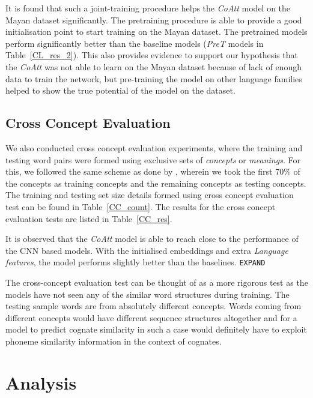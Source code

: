 \documentclass[11pt,letterpaper]{article}
\begin{document}
It is found that such a joint-training procedure helps the \textit{CoAtt} model on the Mayan dataset significantly. The pretraining procedure is able to provide a good initialisation point to start training on the Mayan dataset. The pretrained models perform significantly better than the baseline models (\textit{PreT} models in Table~\ref{CL_res_2}). This also provides evidence to support our hypothesis that the \textit{CoAtt} was not able to learn on the Mayan dataset because of lack of enough data to train the network, but pre-training the model on other language families helped to show the true potential of the model on the dataset.

\subsection{Cross Concept Evaluation}

We also conducted cross concept evaluation experiments, where the training and testing word pairs were formed using exclusive sets of \textit{concepts} or \textit{meanings}. For this, we followed the same scheme as done by \cite{rama2016siamese}, wherein we took the first 70\% of the concepts as training concepts and the remaining concepts as testing concepts. The training and testing set size details formed using cross concept evaluation test can be found in Table~\ref{CC_count}. The results for the cross concept evaluation tests are listed in Table~\ref{CC_res}.

It is observed that the \textit{CoAtt} model is able to reach close to the performance of the CNN based models. With the initialised embeddings and extra \textit{Language features}, the model performs slightly better than the baselines. \texttt{EXPAND}

The cross-concept evaluation test can be thought of as a more rigorous test as the models have not seen any of the similar word structures during training. The testing sample words are from absolutely different concepts. Words coming from different concepts would have different sequence structures altogether and for a model to predict cognate similarity in such a case would definitely have to exploit phoneme similarity information in the context of cognates.

\section{Analysis}
\end{document}
